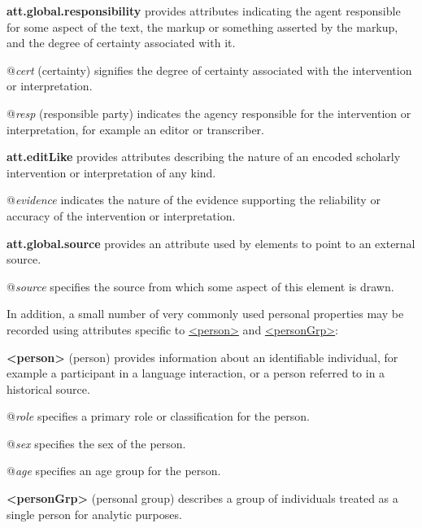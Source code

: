 \begin{sansreflist}
  
\item [\textbf{att.global.responsibility}] provides attributes indicating the agent responsible for some aspect of the text, the markup or something asserted by the markup, and the degree of certainty associated with it.\hfil\\[-10pt]\begin{sansreflist}
    \item[@{\itshape cert}]
  (certainty) signifies the degree of certainty associated with the intervention or interpretation.
    \item[@{\itshape resp}]
  (responsible party) indicates the agency responsible for the intervention or interpretation, for example an editor or transcriber.
\end{sansreflist}  
\item [\textbf{att.editLike}] provides attributes describing the nature of an encoded scholarly intervention or interpretation of any kind.\hfil\\[-10pt]\begin{sansreflist}
    \item[@{\itshape evidence}]
  indicates the nature of the evidence supporting the reliability or accuracy of the intervention or interpretation.
\end{sansreflist}  
\item [\textbf{att.global.source}] provides an attribute used by elements to point to an external source.\hfil\\[-10pt]\begin{sansreflist}
    \item[@{\itshape source}]
  specifies the source from which some aspect of this element is drawn.
\end{sansreflist}  
\end{sansreflist}
 In addition, a small number of very commonly used personal properties may be recorded using attributes specific to \hyperref[TEI.person]{<person>} and \hyperref[TEI.personGrp]{<personGrp>}: 
\begin{sansreflist}
  
\item [\textbf{<person>}] (person) provides information about an identifiable individual, for example a participant in a language interaction, or a person referred to in a historical source.\hfil\\[-10pt]\begin{sansreflist}
    \item[@{\itshape role}]
  specifies a primary role or classification for the person.
    \item[@{\itshape sex}]
  specifies the sex of the person.
    \item[@{\itshape age}]
  specifies an age group for the person.
\end{sansreflist}  
\item [\textbf{<personGrp>}] (personal group) describes a group of individuals treated as a single person for analytic purposes.
\end{sansreflist}
